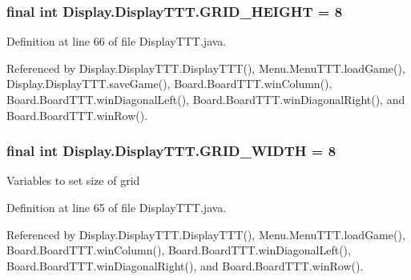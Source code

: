 \subsubsection[{G\+R\+I\+D\+\_\+\+H\+E\+I\+G\+H\+T}]{\setlength{\rightskip}{0pt plus 5cm}final int Display.\+Display\+T\+T\+T.\+G\+R\+I\+D\+\_\+\+H\+E\+I\+G\+H\+T = 8\hspace{0.3cm}{\ttfamily [static]}}\label{class_display_1_1_display_t_t_t_a863d5b47363b01c44552068cd9ee832f}


Definition at line 66 of file Display\+T\+T\+T.\+java.



Referenced by Display.\+Display\+T\+T\+T.\+Display\+T\+T\+T(), Menu.\+Menu\+T\+T\+T.\+load\+Game(), Display.\+Display\+T\+T\+T.\+save\+Game(), Board.\+Board\+T\+T\+T.\+win\+Column(), Board.\+Board\+T\+T\+T.\+win\+Diagonal\+Left(), Board.\+Board\+T\+T\+T.\+win\+Diagonal\+Right(), and Board.\+Board\+T\+T\+T.\+win\+Row().

\hypertarget{class_display_1_1_display_t_t_t_ac07e05126f3b772dd62b3276defc0b4b}{}
\subsubsection[{G\+R\+I\+D\+\_\+\+W\+I\+D\+T\+H}]{\setlength{\rightskip}{0pt plus 5cm}final int Display.\+Display\+T\+T\+T.\+G\+R\+I\+D\+\_\+\+W\+I\+D\+T\+H = 8\hspace{0.3cm}{\ttfamily [static]}}\label{class_display_1_1_display_t_t_t_ac07e05126f3b772dd62b3276defc0b4b}
Variables to set size of grid 

Definition at line 65 of file Display\+T\+T\+T.\+java.



Referenced by Display.\+Display\+T\+T\+T.\+Display\+T\+T\+T(), Menu.\+Menu\+T\+T\+T.\+load\+Game(), Board.\+Board\+T\+T\+T.\+win\+Column(), Board.\+Board\+T\+T\+T.\+win\+Diagonal\+Left(), Board.\+Board\+T\+T\+T.\+win\+Diagonal\+Right(), and Board.\+Board\+T\+T\+T.\+win\+Row().

\hypertarget{class_display_1_1_display_t_t_t_af2ce89b88ce5f8ccae426f4f273d52aa}{}

